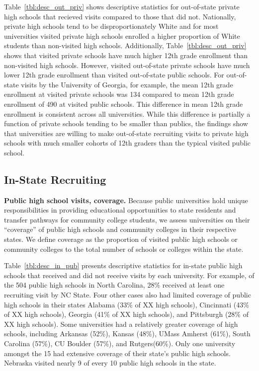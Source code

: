 \documentclass[twoside]{article}
\begin{document}
Table~\ref{tbl:desc_out_priv} shows descriptive statistics for out-of-state private high schools that recieved visits compared to those that did not. Nationally, private high schools tend to be disproportionately White and for most universities visited private high schools enrolled a higher proportion of White students than non-visited high schools. Additionally, Table~\ref{tbl:desc_out_priv} shows that visited private schools have much higher 12th grade enrollment than non-visited high schools. However, visited out-of-state private schools have much lower 12th grade enrollment than visited out-of-state public schools. For out-of-state visits by the University of Georgia, for example, the mean 12th grade enrollment at visited private schools was 134 compared to mean 12th grade enrollment of 490 at visited public schools. This difference in mean 12th grade enrollment is consistent across all universities. While this difference is partially a function of private schools tending to be smaller than publics, the findings show that universities are willing to make out-of-state recruiting visits to private high schools with much smaller cohorts of 12th graders than the typical visited public school.

\subsection*{In-State Recruiting}

\textbf{Public high school visits, coverage.} Because public universities hold unique responsibilities in providing educational opportunities to state residents and transfer pathways for community college students, we assess universities on their ``coverage'' of public high schools and community colleges in their respective states. We define coverage as the proportion of visited public high schools or community colleges to the total number of schools or colleges within the state.

Table~\ref{tbl:desc_in_pub} presents descriptive statistics for in-state public high schools that received and did not receive visits by each university. For example, of the 504 public high schools in North Carolina, 28\% received at least one recruiting visit by NC State.  Four other cases also had limited coverage of public high schools in their states Alabama (33\% of XX high schools), Cincinnati (43\% of XX high schools), Georgia (41\% of XX high schools), and Pittsburgh (28\% of XX high schools). Some universities had a relatively greater coverage of high schools, including Arkansas (52\%), Kansas (48\%), UMass Amherst (61\%), South Carolina (57\%), CU Boulder (57\%), and Rutgers(60\%). Only one university amongst the 15 had extensive coverage of their state’s public high schools. Nebraska visited nearly 9 of every 10 public high schools in the state.
\end{document}
